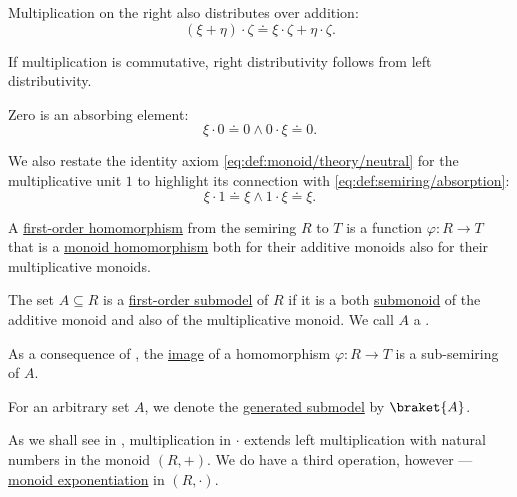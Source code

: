 \begin{definition}
\begin{thmenum}
\begin{thmenum}
       Multiplication on the right also distributes over addition:
      \begin{equation}\label{eq:def:semiring/right_distributivity}
        (\xi + \eta) \cdot \zeta \doteq \xi \cdot \zeta + \eta \cdot \zeta.
      \end{equation}

      If multiplication is commutative, right distributivity follows from left distributivity.

       Zero is an absorbing element:
      \begin{equation}\label{eq:def:semiring/absorption}
        \xi \cdot 0 \doteq 0 \wedge 0 \cdot \xi \doteq 0.
      \end{equation}

       We also restate the identity axiom \eqref{eq:def:monoid/theory/neutral} for the multiplicative unit \( 1 \) to highlight its connection with \eqref{eq:def:semiring/absorption}:
      \begin{equation}\label{eq:def:semiring/identity}
        \xi \cdot 1 \doteq \xi \wedge 1 \cdot \xi \doteq \xi.
      \end{equation}
    \end{thmenum}

     A \hyperref[def:first_order_homomorphism]{first-order homomorphism} from the semiring \( R \) to \( T \) is a function \( \varphi: R \to T \) that is a \hyperref[def:monoid/homomorphism]{monoid homomorphism} both for their additive monoids also for their multiplicative monoids.

     The set \( A \subseteq R \) is a \hyperref[def:first_order_submodel]{first-order submodel} of \( R \) if it is a both \hyperref[def:monoid/submodel]{submonoid} of the additive monoid and also of the multiplicative monoid. We call \( A \) a .

    As a consequence of , the \hyperref[def:set_valued_map/image]{image} of a homomorphism \( \varphi: R \to T \) is a sub-semiring of \( A \).

     For an arbitrary set \( A \), we denote the \hyperref[def:first_order_generated_substructure]{generated submodel} by \( \braket{ A } \).

     As we shall see in , multiplication in \( \cdot \) extends left multiplication with natural numbers in the monoid \( (R, +) \). We do have a third operation, however --- \hyperref[def:monoid/exponentiation]{monoid exponentiation} in \( (R, \cdot) \).


\end{thmenum}
\end{definition}
